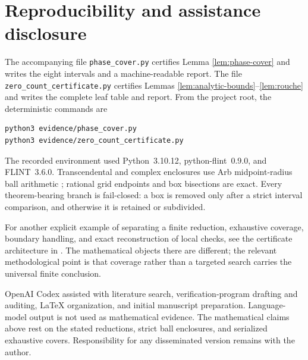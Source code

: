 \documentclass[11pt]{article}
\theoremstyle{remark}
\begin{document}
\section{Reproducibility and assistance disclosure}

The accompanying file \texttt{phase\_cover.py} certifies Lemma
\ref{lem:phase-cover} and writes the eight intervals and a machine-readable
report.  The file \texttt{zero\_count\_certificate.py} certifies Lemmas
\ref{lem:analytic-bounds}--\ref{lem:rouche} and writes the complete leaf
table and report.  From the project root, the deterministic commands are
\begin{verbatim}
python3 evidence/phase_cover.py
python3 evidence/zero_count_certificate.py
\end{verbatim}
The recorded environment used Python~3.10.12, python-flint~0.9.0, and
FLINT~3.6.0.  Transcendental and complex enclosures use Arb midpoint-radius
ball arithmetic \cite{Johansson2017Arb}; rational grid endpoints and box
bisections are exact.  Every theorem-bearing branch is fail-closed: a box is
removed only after a strict interval comparison, and otherwise it is retained
or subdivided.

For another explicit example of separating a finite reduction, exhaustive
coverage, boundary handling, and exact reconstruction of local checks, see
the certificate architecture in \cite{ZengEtAl2026FiniteCertificates}.  The
mathematical objects there are different; the relevant methodological point
is that coverage rather than a targeted search carries the universal finite
conclusion.

OpenAI Codex assisted with literature search, verification-program drafting
and auditing, LaTeX organization, and initial manuscript preparation.
Language-model output is not used as mathematical evidence.  The mathematical
claims above rest on the stated reductions, strict ball enclosures, and
serialized exhaustive covers.  Responsibility for any disseminated version
remains with the author.



\end{document}

